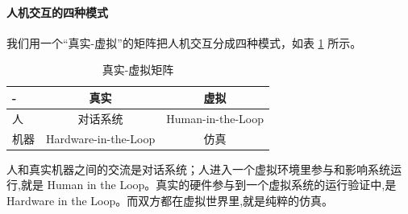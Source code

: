 \paragraph{人机交互的四种模式}

我们用一个“真实-虚拟”的矩阵把人机交互分成四种模式，如表 \ref{tab:realvirtualmatrix} 所示。

\begin{table}[htbp]
    \centering
    \caption{真实-虚拟矩阵}
    \label{tab:realvirtualmatrix}
    \begin{tabular}{lcc}
        \toprule
        - & 真实 & 虚拟 \\
        \midrule
        人 & 对话系统 & Human-in-the-Loop \\
        机器 & Hardware-in-the-Loop & 仿真 \\
        \bottomrule
    \end{tabular}
\end{table}

人和真实机器之间的交流是对话系统；人进入一个虚拟环境里参与和影响系统运行,就是 Human in the Loop。真实的硬件参与到一个虚拟系统的运行验证中,是 Hardware in the Loop。而双方都在虚拟世界里,就是纯粹的仿真。


